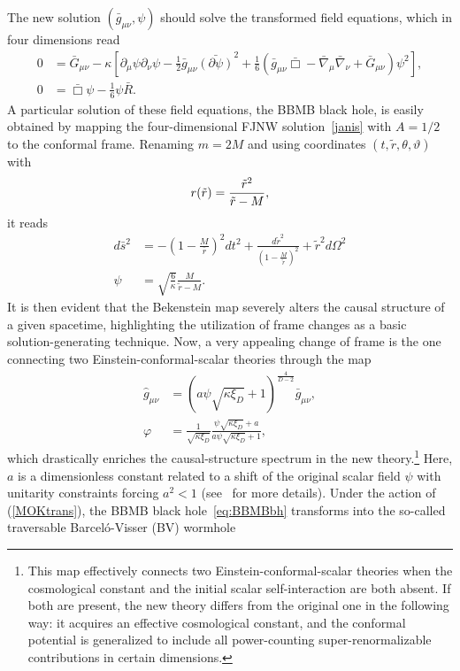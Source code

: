 \documentclass[aps,preprint,groupedaddress,nofootinbib,superscriptaddress,showkeys,showpacs,eqsecnum,amsmath,amssymb]{revtex4-1}
\begin{document}
The new solution $(\bar{g}_{\mu\nu},\psi)$ should solve the transformed field equations, which in four dimensions read
\begin{subequations}
\begin{align}
0&=\bar{G}_{\mu\nu}-\kappa\left[\partial_\mu\psi\partial_\nu\psi-\frac{1}{2}\bar{g}_{\mu\nu}\bar{(\partial \psi)}^2+\frac{1}{6}\left(\bar g_{\mu\nu}\bar{\Box}-\bar{\nabla}_\mu\bar{\nabla}_\nu+\bar{G}_{\mu\nu}\right)\psi^2\right],\\
0&=\bar{\Box}\psi-\frac{1}{6}\psi\bar{R}.
\end{align}
\end{subequations}
A particular solution of these field equations, the BBMB black hole, is easily obtained by mapping the four-dimensional FJNW solution~\eqref{janis} with $A=1/2$ to the conformal frame. Renaming $m=2M$ and using coordinates $(t,\tilde{r},\theta,\vartheta)$ with
\begin{equation}
    r(\Tilde{r})= \frac{\tilde{r}^2}{\tilde{r}-M},
\end{equation}
it reads  
\begin{subequations}
\label{eq:BBMBbh}
\begin{align}
d\bar{s}^2&=-\left(1-\frac{M}{\bar r}\right)^2dt^2+\frac{d\tilde{r}^2}{\left(1-\frac{M}{\tilde{r}}\right)^2}+\tilde{r}^2d\Omega^2\\
\psi&=\sqrt{\frac{6}{\kappa}}\frac{M}{\tilde{r}-M}.
\end{align}
\end{subequations}
It is then evident that the Bekenstein map severely alters the causal structure of a given spacetime, highlighting the utilization of frame changes as a basic solution-generating technique. 
Now, a very appealing change of frame \cite{Ayon-Beato:2015ada} is the one connecting two Einstein-conformal-scalar theories through the map
\begin{subequations}
\label{MOKtrans}
\begin{align}
\hat{g}_{\mu\nu}&=\left(a \psi \sqrt{\kappa\xi_{D}}+1\right)^{\frac{4}{D-2}}\bar{g}_{\mu\nu},\\
\varphi&=\frac{1}{\sqrt{\kappa\xi_{D}}}\frac{\psi\sqrt{\kappa\xi_{D}}+a}{a\psi\sqrt{\kappa\xi_{D}}+1}, 
\end{align}
\end{subequations}
which drastically enriches the causal-structure spectrum in the new theory.\footnote{This map effectively connects two Einstein-conformal-scalar theories when the cosmological constant and the initial scalar self-interaction are both absent. If both are present, the new theory differs from the original one in the following way: it acquires an effective cosmological constant, and the conformal potential is generalized to include all power-counting super-renormalizable contributions in certain dimensions.}  Here, $a$ is a dimensionless constant related to a shift of the original scalar field $\psi$ with unitarity constraints forcing $a^2<1$ (see~\cite{Ayon-Beato:2015ada} for more details). Under the action of (\ref{MOKtrans}), the BBMB black hole~\eqref{eq:BBMBbh} transforms into the so-called traversable Barcel\'o-Visser (BV) wormhole~\cite{Barcelo:1999hq,Barcelo:2000zf}
\end{document}

